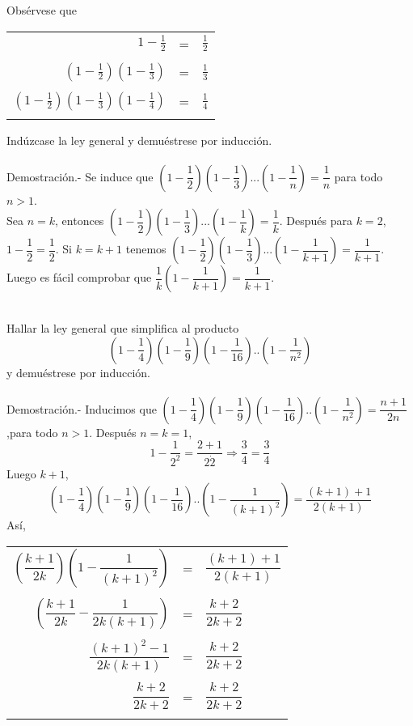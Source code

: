 \begin{ej}
Obsérvese que
\begin{center}
\begin{tabular}{r c l}
$1-\frac{1}{2}$&=&$\frac{1}{2}$\\\\
$(1-\frac{1}{2})(1-\frac{1}{3})$&=&$\frac{1}{3}$\\\\
$(1-\frac{1}{2})(1-\frac{1}{3})(1-\frac{1}{4})$&=&$\frac{1}{4}$\\\\
\end{tabular}
\end{center}
Indúzcase la ley general y demuéstrese por inducción.\\\\
Demostración.- \; Se induce que $\left( 1-\dfrac{1}{2} \right)\left( 1-\dfrac{1}{3} \right)...\left(1- \dfrac{1}{n} \right)=\dfrac{1}{n}$ para todo $n>1$.\\
Sea $n=k$, entonces $\left( 1-\dfrac{1}{2} \right)\left( 1-\dfrac{1}{3} \right)...\left(1- \dfrac{1}{k} \right)=\dfrac{1}{k}$. Después para $k=2$, \; $1-\dfrac{1}{2}=\dfrac{1}{2}$. Si $k=k+1$ tenemos $\left( 1-\dfrac{1}{2} \right) \left( 1-\dfrac{1}{3} \right)...\left(1- \dfrac{1}{k+1} \right)=\dfrac{1}{k+1}$. Luego es fácil comprobar que 
$\dfrac{1}{k}\left(1 - \dfrac{1}{k+1} \right)=\dfrac{1}{k+1}$. \\\\
\end{ej}


\begin{ej}
Hallar la ley general que simplifica al producto $$\left( 1-\dfrac{1}{4} \right)\left( 1-\dfrac{1}{9} \right)\left( 1- \dfrac{1}{16} \right)..\left( 1- \dfrac{1}{n^2} \right)$$ y demuéstrese por inducción.\\\\
Demostración.- \; Inducimos que $\left( 1-\dfrac{1}{4} \right)\left( 1-\dfrac{1}{9} \right)\left( 1- \dfrac{1}{16} \right)..\left( 1- \dfrac{1}{n^2} \right)=\dfrac{n+1}{2n}$,para todo $n>1$. Después $n=k=1$, $$1-\dfrac{1}{2^2}=\dfrac{2+1}{2\dot 2} \Rightarrow \dfrac{3}{4}=\dfrac{3}{4}$$ 
Luego $k+1$, $$\left( 1-\dfrac{1}{4} \right)\left( 1-\dfrac{1}{9} \right)\left( 1- \dfrac{1}{16} \right)..\left( 1- \dfrac{1}{(k+1)^2} \right)=\dfrac{(k+1)+1}{2(k+1)}$$
Así,
\begin{center}
\begin{tabular}{r c l}
$\left( \dfrac{k+1}{2k}\right) \left( 1- \dfrac{1}{(k+1)^2} \right)$&=&$\dfrac{(k+1)+1}{2(k+1)}$\\\\
$\left( \dfrac{k+1}{2k} - \dfrac{1}{2k(k+1)} \right)$&=&$\dfrac{k+2}{2k+2}$\\\\
$\dfrac{(k+1)^2-1}{2k(k+1)}$&=&$\dfrac{k+2}{2k+2}$\\\\
$\dfrac{k+2}{2k+2}$&=&$\dfrac{k+2}{2k+2}$\\\\
\end{tabular}
\end{center}
\end{ej}

